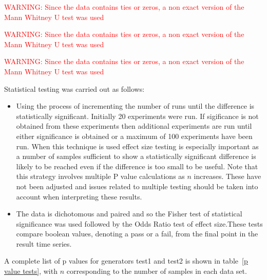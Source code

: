 \documentclass[]{article}
\begin{document}
\textcolor{Red}{WARNING: Since the data contains ties or zeros, a non exact version of the Mann Whitney U test was used
}

\textcolor{Red}{WARNING: Since the data contains ties or zeros, a non exact version of the Mann Whitney U test was used
}

\textcolor{Red}{WARNING: Since the data contains ties or zeros, a non exact version of the Mann Whitney U test was used
}


Statistical testing was carried out as follows: 
\begin{itemize}
\item{Using the process of incrementing the number of runs until the difference is statistically significant. Initially 20 experiments were run. If sigificance is not obtained from these experiments then additional experiments are run until either significance is obtained or a maximum of 100 experiments have been run. When this technique is used effect size testing is especially important as a number of samples sufficient to show a statistically significant difference is likely to be reached even if the difference is too small to be useful. Note that this strategy involves multiple P value calculations as $n$ increases. These have not been adjusted and issues related to multiple testing should be taken into account when interpreting these results.
}
\item{The data is dichotomous and paired and so the Fisher test of statistical significance was used followed by the Odds Ratio test of effect size.These tests compare boolean values, denoting a pass or a fail, from the final point in the result time series. }
\end{itemize}A complete list of p values for generators test1 and test2 is shown in table~\ref{p value tests}, with $n$ corresponding to the number of samples in each data set.
\end{document}
